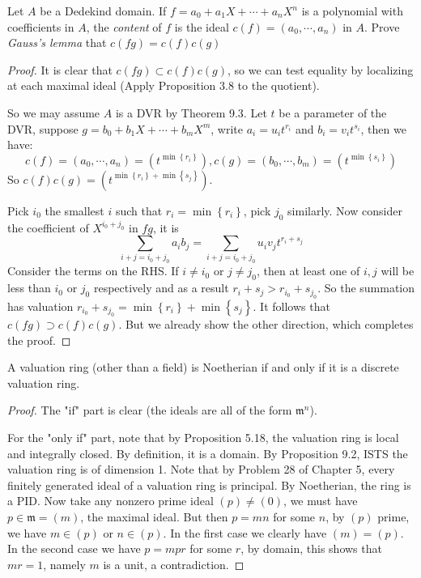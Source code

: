 \documentclass{solution}
\begin{document}
\begin{problem}
    Let $A$ be a Dedekind domain. If $f = a_0 + a_1 X + \cdots + a_n X^n$ is a polynomial with coefficients in $A$, the \textit{content} of $f$ is the ideal $c(f) = (a_0, \cdots, a_n)$ in $A$. Prove \textit{Gauss's lemma} that $c(fg) = c(f) c(g)$
\end{problem}

\begin{proof}
    It is clear that $c(fg) \subset c(f)c(g)$, so we can test equality by localizing at each maximal ideal (Apply Proposition 3.8 to the quotient).

    So we may assume $A$ is a DVR by Theorem 9.3. Let $t$ be a parameter of the DVR, suppose $g = b_0 + b_1X + \cdots + b_mX^m$, write $a_i = u_i t^{r_i}$ and $b_i = v_it^{s_i}$, then we have:
    $$c(f) = (a_0, \cdots, a_n) = (t^{\min \left\lbrace r_i \right\rbrace}), c(g) = (b_0, \cdots, b_m) = (t^{\min \left\lbrace s_i \right\rbrace})$$
    So $c(f)c(g) = (t^{\min \left\lbrace r_i \right\rbrace + \min \left\lbrace s_j \right\rbrace})$.

    Pick $i_0$ the smallest $i$ such that $r_{i} = \min \left\lbrace r_i \right\rbrace$, pick $j_0$ similarly. Now consider the coefficient of $X^{i_0 + j_0}$ in $fg$, it is
    $$\sum\limits_{i + j = i_0 + j_0} a_{i}b_j = \sum\limits_{i + j = i_0 + j_0} u_iv_j t^{r_i + s_j}$$
    Consider the terms on the RHS. If $i \ne i_0$ or $j \ne j_0$, then at least one of $i, j$ will be less than $i_0$ or $j_0$ respectively and as a result $r_i + s_j \gt r_{i_0} + s_{j_0}$. So the summation has valuation $r_{i_0} + s_{j_0} = \min \left\lbrace r_i \right\rbrace + \min \left\lbrace s_j \right\rbrace$. It follows that $c(fg) \supset c(f)c(g)$. But we already show the other direction, which completes the proof.
\end{proof}

\begin{problem}
    A valuation ring (other than a field) is Noetherian if and only if it is a discrete valuation ring.
\end{problem}

\begin{proof}
    The "if" part is clear (the ideals are all of the form $\mathfrak{m}^n$).

    For the "only if" part, note that by Proposition 5.18, the valuation ring is local and integrally closed. By definition, it is a domain. By Proposition 9.2, ISTS the valuation ring is of dimension 1. Note that by Problem 28 of Chapter 5, every finitely generated ideal of a valuation ring is principal. By Noetherian, the ring is a PID. Now take any nonzero prime ideal $(p) \ne (0)$, we must have $p \in \mathfrak{m} = (m)$, the maximal ideal. But then $p = mn$ for some $n$, by $(p)$ prime, we have $m \in (p)$ or $n \in (p)$. In the first case we clearly have $(m) = (p)$. In the second case we have $p = mpr$ for some $r$, by domain, this shows that $mr = 1$, namely $m$ is a unit, a contradiction.
\end{proof}
\end{document}
